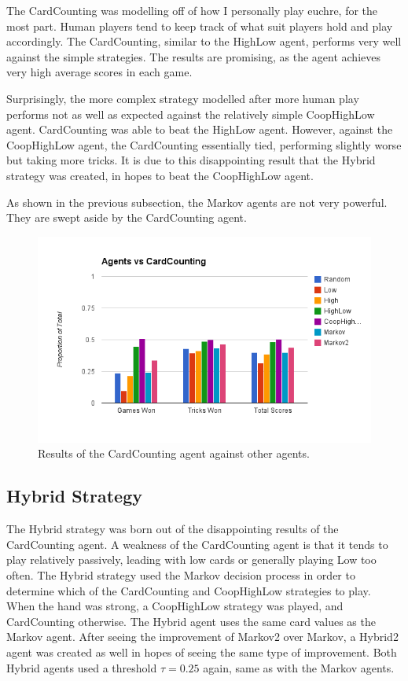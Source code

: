 The CardCounting was modelling off of how I personally play euchre, for the most part. Human players tend to keep track of what suit
players hold and play accordingly. The CardCounting, similar to the HighLow agent, performs very well against the simple strategies.
The results are promising, as the agent achieves very high average scores in each game.

Surprisingly, the more complex strategy modelled after more human play performs not as well as expected against the relatively simple
CoopHighLow agent. CardCounting was able to beat the HighLow agent. However, against the CoopHighLow agent, the CardCounting
essentially tied, performing slightly worse but taking more tricks. It is due to this disappointing result that the Hybrid strategy
was created, in hopes to beat the CoopHighLow agent.

As shown in the previous subsection, the Markov agents are not very powerful. They are swept aside by the CardCounting agent.

\begin{figure}[ht]
    \centering
    \includegraphics[scale=0.5]{data/cardcounting.png}
    \caption{Results of the CardCounting agent against other agents.}
    \label{fig:results_cardcounting}
\end{figure}


\subsection{Hybrid Strategy}

The Hybrid strategy was born out of the disappointing results of the CardCounting agent. A weakness of the CardCounting agent is that
it tends to play relatively passively, leading with low cards or generally playing Low too often. The Hybrid strategy used the Markov
decision process in order to determine which of the CardCounting and CoopHighLow strategies to play. When the hand was strong, a CoopHighLow
strategy was played, and CardCounting otherwise. The Hybrid agent uses the same card values as the Markov agent. After seeing the improvement
of Markov2 over Markov, a Hybrid2 agent was created as well in hopes of seeing the same type of improvement. Both Hybrid agents used
a threshold $\tau=0.25$ again, same as with the Markov agents.

